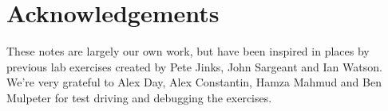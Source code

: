 \section{Acknowledgements}
These notes are largely our own work, but have been inspired in places by previous lab exercises created by Pete Jinks, John Sargeant and Ian Watson. We're very grateful to Alex Day, Alex Constantin, Hamza Mahmud and Ben Mulpeter for test driving and debugging the exercises.
